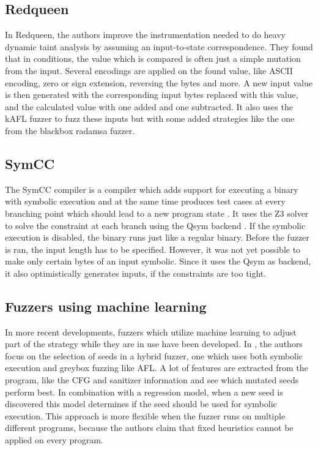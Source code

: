\subsection{Redqueen}\label{subsec:redqueen}
In Redqueen, the authors improve the instrumentation needed to do heavy dynamic taint analysis by assuming an input-to-state correspondence. They found that in conditions, the value which is compared is often just a simple mutation from the input. Several encodings are applied on the found value, like ASCII encoding, zero or sign extension, reversing the bytes and more. A new input value is then generated with the corresponding input bytes replaced with this value, and the calculated value with one added and one subtracted. 
It also uses the kAFL \cite{schumilo2017kafl} fuzzer to fuzz these inputs but with some added strategies like the one from the blackbox radamsa fuzzer\cite{helin2018radamsa}. 

\subsection{SymCC}\label{subsec:symcc}
The SymCC compiler is a compiler which adds support for executing a binary with symbolic execution and at the same time produces test cases at every branching point which should lead to a new program state \cite{poeplau2020symbolic}. It uses the Z3 solver \cite{de2008z3} to solve the constraint at each branch using the Qsym backend \cite{yun2018qsym}. If the symbolic execution is disabled, the binary runs just like a regular binary. Before the fuzzer is ran, the input length has to be specified. However, it was not yet possible to make only certain bytes of an input symbolic. Since it uses the Qsym as backend, it also optimistically generates inputs, if the constraints are too tight.

\subsection{Fuzzers using machine learning}\label{subsec:MLfuzzers}
In more recent developments, fuzzers which utilize machine learning to adjust part of the strategy while they are in use have been developed.
In \cite{chen2020meuzz}, the authors focus on the selection of seeds in a hybrid fuzzer, one which uses both symbolic execution and greybox fuzzing like AFL. A lot of features are extracted from the program, like the CFG and sanitizer information and see which mutated seeds perform best. In combination with a regression model, when a new seed is discovered this model determines if the seed should be used for symbolic execution. This approach is more flexible when the fuzzer runs on multiple different programs, because the authors claim that fixed heuristics cannot be applied on every program.

